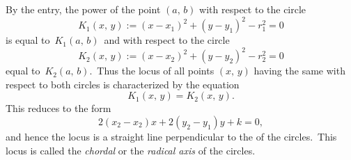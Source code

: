 \documentclass[12pt]{article}
\begin{document}
By the  entry, the power of the point $(a,\,b)$ with respect to the circle
            $$K_1(x,\,y) := (x-x_1)^2+(y-y_1)^2-r_1^2 =0$$
is equal to \,$K_1(a,\,b)$\, and with respect to the circle 
            $$K_2(x,\,y) := (x-x_2)^2+(y-y_2)^2-r_2^2 =0$$
equal to \,$K_2(a,\,b)$. \,Thus the locus of all points $(x,\,y)$ having the same  with respect to both circles is characterized by the equation
                 $$K_1(x,\,y) = K_2(x,\,y).$$
This reduces to the form
          $$2(x_2-x_2)x+2(y_2-y_1)y+k = 0,$$
and hence the locus is a straight line perpendicular to the  of the circles. \,This locus is called the {\em chordal} or the {\em radical axis} of the circles.
\end{document}

